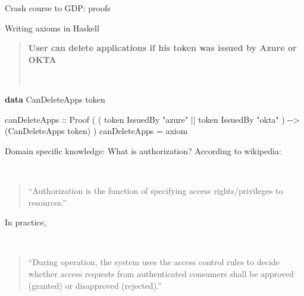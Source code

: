 \documentclass[
  9pt,
  ignorenonframetext,
]{beamer}
\newenvironment{Shaded}{}{}
\newcommand{\DataTypeTok}[1]{\textcolor[rgb]{0.56,0.13,0.00}{#1}}
\newcommand{\KeywordTok}[1]{\textcolor[rgb]{0.00,0.44,0.13}{\textbf{#1}}}
\newcommand{\NormalTok}[1]{#1}
\newcommand{\OperatorTok}[1]{\textcolor[rgb]{0.40,0.40,0.40}{#1}}
\newcommand{\OtherTok}[1]{\textcolor[rgb]{0.00,0.44,0.13}{#1}}
\newcommand{\StringTok}[1]{\textcolor[rgb]{0.25,0.44,0.63}{#1}}
\begin{document}
\begin{frame}[fragile]{Crash course to GDP: proofs}
\protect\hypertarget{crash-course-to-gdp-proofs-6}{}
\begin{block}{Writing axioms in Haskell}
\protect\hypertarget{writing-axioms-in-haskell-1}{}
\hfill\break

\begin{quote}
\textbf{User can delete applications if his token was issued by Azure or
OKTA}\\
\strut \\
\end{quote}

\begin{Shaded}
\begin{Highlighting}[]
\KeywordTok{data} \DataTypeTok{CanDeleteApps}\NormalTok{ token}

\NormalTok{canDeleteApps }
\OtherTok{  ::} \DataTypeTok{Proof}\NormalTok{ (}
\NormalTok{       ( token }\OtherTok{\textasciigrave{}IssuedBy\textasciigrave{}} \StringTok{"azure"} 
         \OperatorTok{||}\NormalTok{ token }\OtherTok{\textasciigrave{}IssuedBy\textasciigrave{}} \StringTok{"okta"}
\NormalTok{       )}
       \OperatorTok{{-}{-}\textgreater{}}
\NormalTok{       (}\DataTypeTok{CanDeleteApps}\NormalTok{ token)}
\NormalTok{     )}
\NormalTok{canDeleteApps }\OtherTok{=}\NormalTok{ axiom}
\end{Highlighting}
\end{Shaded}
\end{block}



\end{frame}

\begin{frame}{Domain specific knowledge: What is authorization?}
\protect\hypertarget{domain-specific-knowledge-what-is-authorization}{}
According to wikipedia:\\
\strut \\

\begin{quote}
``Authorization is the function of specifying access rights/privileges
to resources.''
\end{quote}

In practice,\\
\strut \\

\begin{quote}
``During operation, the system uses the access control rules to decide
whether access requests from authenticated consumers shall be approved
(granted) or disapproved (rejected).''
\end{quote}



\end{frame}
\end{document}
